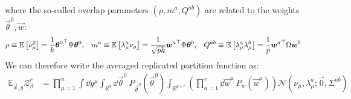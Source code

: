 \documentclass[11pt]{article}
\numberwithin{equation}{section}
\begin{document}
\noindent where the so-called overlap parameters $(\rho, m^{a}, Q^{ab})$ are related to the weights $\vec{\theta}^{0}, \vec{w}$:
\begin{align}
\rho &\equiv \mathbb{E}\left[\nu_{\mu}^2\right] = \frac{1}{k}{\vec{\theta}^{0}}^{\top}\Psi\vec{\theta}^{0}, && m^{a} \equiv \mathbb{E}\left[\lambda_{\mu}^{a}\nu_{\mu}\right]= \frac{1}{\sqrt{pk}}{\vec{w}^{a}}^{\top}\Phi\vec{\theta}^{0}, && Q^{ab} \equiv \mathbb{E}\left[\lambda_{\mu}^{a}\lambda_{\mu}^{b}\right]= \frac{1}{p}{\vec{w}^{a}}^{\top}\Omega \vec{w}^{b}	\notag
\end{align}
We can therefore write the averaged replicated partition function as:
\begin{align}
\mathbb{E}_{\vec{x},y}\mathcal{Z}^{r}_{\beta} &=\prod\limits_{\mu=1}^{n}\int\dd y^{\mu}\int_{\mathbb{R}^{d}}\dd\vec{\theta}^{0}~P_{\vec{\theta}^{0}}(\vec{\theta}^{0})	\int_{\mathbb{R}^{p\times r}}\left(\prod\limits_{a=1}^{r}\dd\vec{w}^{a}~P_{w}(\vec{w}^{a})\right)\mathcal{N}(\nu_{\mu}, \lambda^{a}_{\mu};\vec{0},\Sigma^{ab})
\label{eq:avgZr:2}
\end{align}

\end{document}
